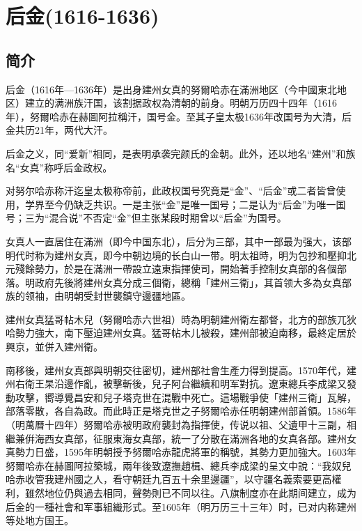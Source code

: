 
\section{后金\tiny(1616-1636)}

\subsection{简介}

后金（1616年—1636年）是出身建州女真的努爾哈赤在滿洲地区（今中國東北地区）建立的满洲族汗国，该割据政权為清朝的前身。明朝万历四十四年（1616年），努爾哈赤在赫圖阿拉稱汗，国号金。至其子皇太极1636年改国号为大清，后金共历21年，两代大汗。

后金之义，同“爱新”相同，是表明承袭完颜氏的金朝。此外，还以地名“建州”和族名“女真”称呼后金政权。

对努尔哈赤称汗迄皇太极称帝前，此政权国号究竟是“金”、“后金”或二者皆曾使用，学界至今仍缺乏共识。一是主张“金”是唯一国号；二是认为“后金”为唯一国号；三为“混合说”不否定“金”但主张某段时期曾以“后金”为国号。

女真人一直居住在滿洲（即今中国东北），后分为三部，其中一部最为强大，该部明代时称为建州女真，即今中朝边境的长白山一带。明太祖時，明为包抄和壓抑北元殘餘勢力，於是在滿洲一帶設立遠東指揮使司，開始著手控制女真部的各個部落。明政府先後將建州女真分成三個衛，總稱「建州三衛」，其首领大多為女真部族的领袖，由明朝受封世襲鎮守邊疆地區。

建州女真猛哥帖木兒（努爾哈赤六世祖）時為明朝建州衛左都督，北方的部族兀狄哈勢力強大，南下壓迫建州女真。猛哥帖木儿被殺，建州部被迫南移，最終定居於興京，並併入建州衛。

南移後，建州女真部與明朝交往密切，建州部社會生產力得到提高。1570年代，建州右衛王杲沿邊作亂，被擊斬後，兒子阿台繼續和明军對抗。遼東總兵李成梁又發動攻擊，嚮導覺昌安和兒子塔克世在混戰中死亡。這場戰爭使「建州三衛」瓦解，部落零散，各自為政。而此時正是塔克世之子努爾哈赤任明朝建州部首領。1586年（明萬曆十四年）努爾哈赤被明政府襲封為指揮使，传说以祖、父遺甲十三副，相繼兼倂海西女真部，征服東海女真部，統一了分散在滿洲各地的女真各部。建州女真勢力日盛，1595年明朝授予努爾哈赤龍虎將軍的稱號，其勢力更加強大。1603年努爾哈赤在赫圖阿拉築城，兩年後致遼撫趙楫、總兵李成梁的呈文中說：“我奴兒哈赤收管我建州國之人，看守朝廷九百五十余里邊疆”，以守疆名義索要更高權利，雖然地位仍與過去相同，聲勢則已不同以往。八旗制度亦在此期间建立，成为后金的一種社會和军事組織形式。至1605年（明万历三十三年）时，已对内称建州等处地方国王。

